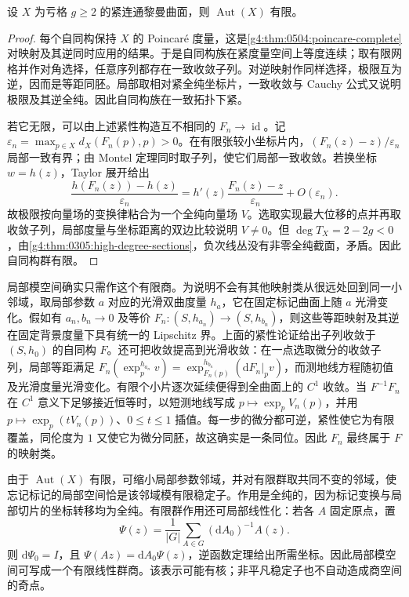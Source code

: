\begin{proposition}
	\label{g4:prop:0604:finite-automorphisms}
	设 \(X\) 为亏格 \(g\ge2\) 的紧连通黎曼曲面，则 \(\operatorname{Aut}(X)\) 有限。
\end{proposition}
\begin{proof}
	每个自同构保持 \(X\) 的 Poincaré 度量，这是\cref{g4:thm:0504:poincare-complete}对映射及其逆同时应用的结果。于是自同构族在紧度量空间上等度连续；取有限网格并作对角选择，任意序列都存在一致收敛子列。对逆映射作同样选择，极限互为逆，因而是等距同胚。局部取相对紧全纯坐标片，一致收敛与 Cauchy 公式又说明极限及其逆全纯。因此自同构族在一致拓扑下紧。

	若它无限，可以由上述紧性构造互不相同的 \(F_n\to\operatorname{id}\)。记 \(\varepsilon_n=\max_{p\in X}d_X(F_n(p),p)>0\)。在有限张较小坐标片内，\((F_n(z)-z)/\varepsilon_n\) 局部一致有界；由 Montel 定理同时取子列，使它们局部一致收敛。若换坐标 \(w=h(z)\)，Taylor 展开给出
	\[
		\frac{h(F_n(z))-h(z)}{\varepsilon_n}
		=h'(z)\frac{F_n(z)-z}{\varepsilon_n}+O(\varepsilon_n).
	\]
	故极限按向量场的变换律粘合为一个全纯向量场 \(V\)。选取实现最大位移的点并再取收敛子列，局部度量与坐标距离的双边比较说明 \(V\ne0\)。但 \(\deg T_X=2-2g<0\)，由\cref{g4:thm:0305:high-degree-sections}，负次线丛没有非零全纯截面，矛盾。因此自同构群有限。
\end{proof}

局部模空间确实只需作这个有限商。为说明不会有其他映射类从很远处回到同一小邻域，取局部参数 \(a\) 对应的光滑双曲度量 \(h_a\)，它在固定标记曲面上随 \(a\) 光滑变化。假如有 \(a_n,b_n\to0\) 及等价 \(F_n:(S,h_{a_n})\to(S,h_{b_n})\)，则这些等距映射及其逆在固定背景度量下具有统一的 Lipschitz 界。上面的紧性论证给出子列收敛于 \((S,h_0)\) 的自同构 \(F\)。还可把收敛提高到光滑收敛：在一点选取微分的收敛子列，局部等距满足 \(F_n(\exp_p^{h_{a_n}}v)=\exp_{F_n(p)}^{h_{b_n}}(\mathrm{d}F_n|_p v)\)，而测地线方程随初值及光滑度量光滑变化。有限个小片逐次延续便得到全曲面上的 \(C^1\) 收敛。当 \(F^{-1}F_n\) 在 \(C^1\) 意义下足够接近恒等时，以短测地线写成 \(p\mapsto\exp_pV_n(p)\)，并用 \(p\mapsto\exp_p(tV_n(p))\)、\(0\le t\le1\) 插值。每一步的微分都可逆，紧性使它为有限覆盖，同伦度为 \(1\) 又使它为微分同胚，故这确实是一条同位。因此 \(F_n\) 最终属于 \(F\) 的映射类。

\ProseParagraphBreak

由于 \(\operatorname{Aut}(X)\) 有限，可缩小局部参数邻域，并对有限群取共同不变的邻域，使忘记标记的局部空间恰是该邻域模有限稳定子。作用是全纯的，因为标记变换与局部切片的坐标转移均为全纯。有限群作用还可局部线性化：若各 \(A\) 固定原点，置
\[
	\Psi(z)=\frac1{|G|}\sum_{A\in G}(\mathrm{d}A_0)^{-1}A(z).
\]
则 \(\mathrm{d}\Psi_0=I\)，且 \(\Psi(Az)=\mathrm{d}A_0\Psi(z)\)，逆函数定理给出所需坐标。因此局部模空间可写成一个有限线性群商。该表示可能有核；非平凡稳定子也不自动造成商空间的奇点。

